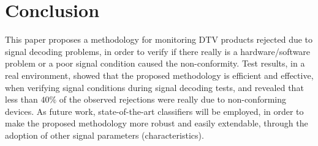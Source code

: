 \documentclass[conference]{IEEEtran}
\begin{document}
%






\section{Conclusion}
This paper proposes a methodology for monitoring DTV products rejected due to signal decoding problems, in order to verify if there really is a hardware/software problem or a poor signal condition caused the non-conformity. Test results, in a real environment, showed that the proposed methodology is efficient and effective, when verifying signal conditions during signal decoding tests, and revealed that less than $40\%$ of the observed rejections were really due to non-conforming devices. As future work, state-of-the-art classifiers will be employed, in order to make the proposed methodology more robust and easily extendable, through the adoption of other signal parameters (characteristics).
\end{document}
